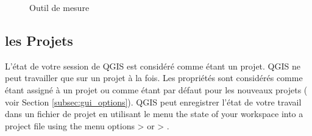 \begin{figure}[h]
\caption{Outil de mesure \nixcaption} \label{fig:measure}
\centering
  \goodgap
\end{figure}

%
%
%

\subsection{les Projets}\label{sec:projects}

L'état de votre session de QGIS est considéré comme étant un projet. QGIS ne peut travailler que sur un projet à la fois. Les propriétés sont considérés comme étant assigné à un projet ou comme étant par défaut pour les nouveaux projets ( voir Section \ref{subsec:gui_options}). QGIS peut enregistrer l'état de votre travail dans un fichier de projet en utilisant le menu the state of your 
workspace into a project file using the menu options 
 > 
or  > .

